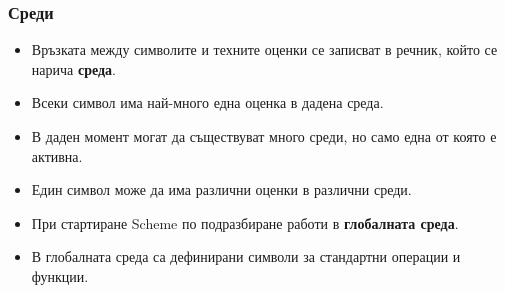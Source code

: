 \documentclass{beamer}
\begin{document}
\begin{frame}
  \frametitle{Среди}

  \begin{itemize}
  \item Връзката между символите и техните оценки се записват в речник, който се нарича \textbf{среда}.
  \item Всеки символ има най-много една оценка в дадена среда.
  \item В даден момент могат да съществуват много среди, но само една от която е активна.
  \item \alert{Един символ може да има различни оценки в различни среди.}
  \item При стартиране Scheme по подразбиране работи в \textbf{глобалната среда}.
  \item В глобалната среда са дефинирани символи за стандартни операции и функции.
  \end{itemize}
\end{frame}
\end{document}
